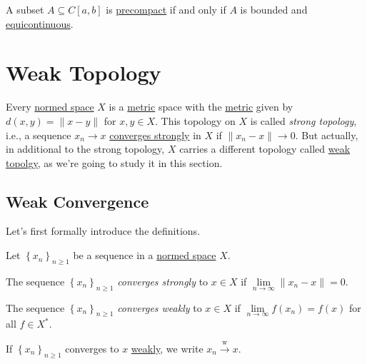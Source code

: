 \begin{theorem}\label{thm:Arzela-Ascoli}
	A subset \(A \subseteq C[a, b]\) is \hyperref[def:precompact]{precompact} if and only if \(A\) is bounded and \hyperref[def:equicontinuous]{equicontinuous}.
\end{theorem}

\section{Weak Topology}
Every \hyperref[def:normed-vector-space]{normed space} \(X\) is a \hyperref[prev:metric]{metric} space with the \hyperref[prev:metric]{metric} given by \(d(x, y) = \lVert x - y \rVert \) for \(x, y\in X\). This topology on \(X\) is called \emph{strong topology}, i.e., a sequence \(x_n \to x\) \hyperref[def:strongly-convergence]{converges strongly} in \(X\) if \(\lVert x_{n} - x \rVert \to 0\). But actually, in additional to the strong topology, \(X\) carries a different topology called \hyperref[def:weak-topology]{weak topolgy}, as we're going to study it in this section.

\subsection{Weak Convergence}
Let's first formally introduce the definitions.
\begin{definition*}
	Let \(\left\{ x_n \right\} _{n\geq 1}\) be a sequence in a \hyperref[def:normed-vector-space]{normed space} \(X\).
	\begin{definition}\label{def:strongly-convergence}
		The sequence \(\left\{ x_n \right\} _{n\geq 1}\) \emph{converges strongly} to \(x\in X\) if \(\lim\limits_{n \to \infty} \lVert x_n - x \rVert = 0\).
	\end{definition}
	\begin{definition}\label{def:weakly-convergence}
		The sequence \(\left\{ x_n \right\} _{n\geq 1}\) \emph{converges weakly} to \(x\in X\) if \(\lim\limits_{n \to \infty} f(x_n) = f(x)\) for all \(f\in X^{\ast} \).
	\end{definition}
\end{definition*}

\begin{notation}
	If \(\left\{ x_n \right\} _{n \geq 1}\) converges to \(x\) \hyperref[def:weakly-convergence]{weakly}, we write \(x_n \overset{\text{w}}{\to } x\).
\end{notation}

